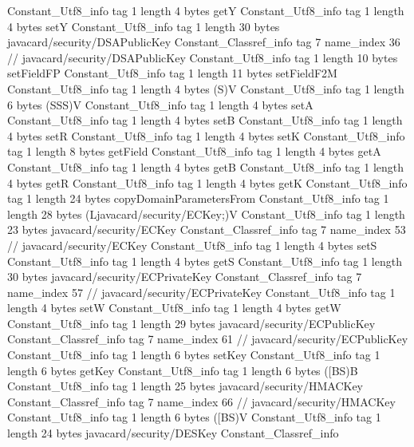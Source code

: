 {{{		}
		Constant_Utf8_info {
			tag	1
			length	4
			bytes	getY
		}
		Constant_Utf8_info {
			tag	1
			length	4
			bytes	setY
		}
		Constant_Utf8_info {
			tag	1
			length	30
			bytes	javacard/security/DSAPublicKey
		}
		Constant_Classref_info {
			tag	7
			name_index	36		// javacard/security/DSAPublicKey
		}
		Constant_Utf8_info {
			tag	1
			length	10
			bytes	setFieldFP
		}
		Constant_Utf8_info {
			tag	1
			length	11
			bytes	setFieldF2M
		}
		Constant_Utf8_info {
			tag	1
			length	4
			bytes	(S)V
		}
		Constant_Utf8_info {
			tag	1
			length	6
			bytes	(SSS)V
		}
		Constant_Utf8_info {
			tag	1
			length	4
			bytes	setA
		}
		Constant_Utf8_info {
			tag	1
			length	4
			bytes	setB
		}
		Constant_Utf8_info {
			tag	1
			length	4
			bytes	setR
		}
		Constant_Utf8_info {
			tag	1
			length	4
			bytes	setK
		}
		Constant_Utf8_info {
			tag	1
			length	8
			bytes	getField
		}
		Constant_Utf8_info {
			tag	1
			length	4
			bytes	getA
		}
		Constant_Utf8_info {
			tag	1
			length	4
			bytes	getB
		}
		Constant_Utf8_info {
			tag	1
			length	4
			bytes	getR
		}
		Constant_Utf8_info {
			tag	1
			length	4
			bytes	getK
		}
		Constant_Utf8_info {
			tag	1
			length	24
			bytes	copyDomainParametersFrom
		}
		Constant_Utf8_info {
			tag	1
			length	28
			bytes	(Ljavacard/security/ECKey;)V
		}
		Constant_Utf8_info {
			tag	1
			length	23
			bytes	javacard/security/ECKey
		}
		Constant_Classref_info {
			tag	7
			name_index	53		// javacard/security/ECKey
		}
		Constant_Utf8_info {
			tag	1
			length	4
			bytes	setS
		}
		Constant_Utf8_info {
			tag	1
			length	4
			bytes	getS
		}
		Constant_Utf8_info {
			tag	1
			length	30
			bytes	javacard/security/ECPrivateKey
		}
		Constant_Classref_info {
			tag	7
			name_index	57		// javacard/security/ECPrivateKey
		}
		Constant_Utf8_info {
			tag	1
			length	4
			bytes	setW
		}
		Constant_Utf8_info {
			tag	1
			length	4
			bytes	getW
		}
		Constant_Utf8_info {
			tag	1
			length	29
			bytes	javacard/security/ECPublicKey
		}
		Constant_Classref_info {
			tag	7
			name_index	61		// javacard/security/ECPublicKey
		}
		Constant_Utf8_info {
			tag	1
			length	6
			bytes	setKey
		}
		Constant_Utf8_info {
			tag	1
			length	6
			bytes	getKey
		}
		Constant_Utf8_info {
			tag	1
			length	6
			bytes	([BS)B
		}
		Constant_Utf8_info {
			tag	1
			length	25
			bytes	javacard/security/HMACKey
		}
		Constant_Classref_info {
			tag	7
			name_index	66		// javacard/security/HMACKey
		}
		Constant_Utf8_info {
			tag	1
			length	6
			bytes	([BS)V
		}
		Constant_Utf8_info {
			tag	1
			length	24
			bytes	javacard/security/DESKey
		}
		Constant_Classref_info {
}}}
